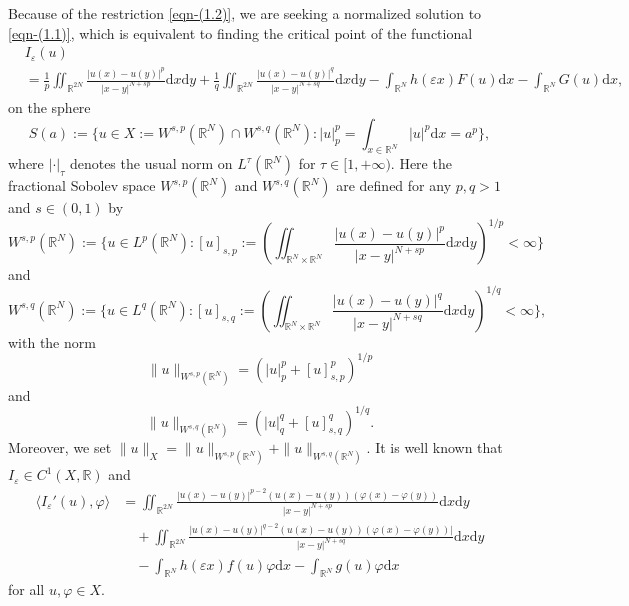 \documentclass[10pt,a4paper]{amsart}
\numberwithin{equation}{section}
\begin{document}
Because of  the restriction  \eqref{eqn-(1.2)}, we are seeking a normalized solution to
\eqref{eqn-(1.1)}, which is equivalent to finding the critical point of the  functional
\begin{align*}
&I_{\varepsilon}(u) \\
&=\frac{1}{p}\iint_{\mathbb{R}^{2N}}\frac{|u(x)-u(y)|^p}{|x-y|^{N+sp}}
\mathrm{d}x\mathrm{d}y
 +\frac{1}{q}\iint_{\mathbb{R}^{2N}}\frac{|u(x)-u(y)|^q}{|x-y|^{N+sq}}
 \mathrm{d}x\mathrm{d}y
 -\int_{\mathbb{R}^N}h(\varepsilon x)F(u)\mathrm{d}x-\int_{\mathbb{R}^{N}}G(u)
 \mathrm{d}x,
\end{align*}
on the sphere
\begin{equation}\label{eqn-(1.3)}
S(a):=\{u\in X:=W^{s,p}(\mathbb {R}^N)\cap W^{s,q}(\mathbb {R}^N):|u|_p^{p}=\int_{x\in \mathbb{R}^{N}}|u|^{p}\mathrm{d}x=a^{p}\},
\end{equation}
where $|\cdot|_\tau$ denotes the usual norm on $L^{\tau}(\mathbb {R}^N)$ for
$\tau \in [1,+\infty)$.
Here the fractional Sobolev space
$W^{s,p}(\mathbb {R}^N)$ and $W^{s,q}(\mathbb {R}^N)$ are defined for any $p,q > 1$
and $s \in (0, 1)$ by
$$
W^{s,p}(\mathbb {R}^N):=\{u\in L^{p}(\mathbb {R}^N):[u]_{s,p}:=(\iint_{\mathbb{R}^{N}
\times\mathbb{R}^{N}}\frac{|u(x)-u(y)|^p}{|x-y|^{N+sp}}\mathrm{d}x\mathrm{d}y)^{1/p}<\infty\}$$
and
$$
W^{s,q}(\mathbb {R}^N):=\{u\in L^{q}(\mathbb {R}^N):[u]_{s,q}
:=(\iint_{\mathbb{R}^{N}\times\mathbb{R}^{N}}\frac{|u(x)-u(y)|^q}{|x-y|^{N+sq}}\mathrm{d}x\mathrm{d}y)^{1/q}<\infty\},
$$
with the norm
$$
\|u\|_{W^{s,p}(\mathbb {R}^N)}=(|u|_{p}^p+[u]_{s,p}^{p})^{1/p}
$$
and
$$
\|u\|_{W^{s,q}(\mathbb {R}^N)}=(|u|_{q}^q+[u]_{s,q}^{q})^{1/q}.
$$
Moreover, we set $\|u\|_X=\|u\|_{W^{s,p}(\mathbb {R}^N)}+\|u\|_{W^{s,q}(\mathbb {R}^N)}$.
It is well known that $I_{\varepsilon} \in C^{1}(X,\mathbb {R})$ and
\begin{align*}
\langle I_{\varepsilon}' (u),\varphi \rangle
&= \iint_{\mathbb{R}^{2N}}\frac{|u(x)-u(y)|^{p-2}(u(x)-u(y))(\varphi(x)-\varphi(y))}{|x-y|^{N+sp}}\mathrm{d}x\mathrm{d}y\\
&\quad +\iint_{\mathbb{R}^{2N}}\frac{|u(x)-u(y)|^{q-2}(u(x)-u(y))(\varphi(x)-\varphi(y))|}{|x-y|^{N+sq}}\mathrm{d}x\mathrm{d}y\\
&\quad -\int_{ \mathbb{R}^{N}}h(\varepsilon x)f(u)\varphi \mathrm{d}x-\int_{ \mathbb{R}^{N}}g(u)\varphi\mathrm{d}x
\end{align*}
for all $u,\varphi\in X$.
\end{document}
